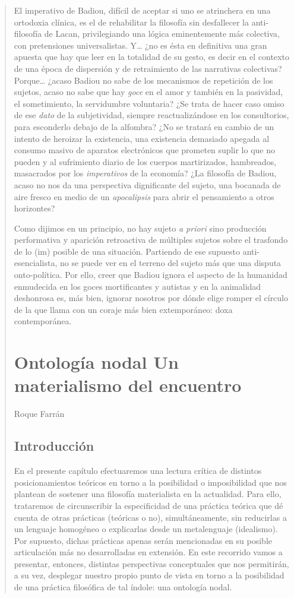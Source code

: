 \begin{quote}
El imperativo de Badiou, difícil de aceptar si uno se atrinchera en una ortodoxia clínica, es el de rehabilitar la filosofía sin desfallecer la anti-filosofía de Lacan, privilegiando una lógica eminentemente más colectiva, con pretensiones universalistas. Y\ldots{} ¿no es ésta en definitiva una gran apuesta que hay que leer en la totalidad de su gesto, es decir en el contexto de una época de dispersión y de retraimiento de las narrativas colectivas? Porque\ldots{} ¿acaso Badiou no sabe de los mecanismos de repetición de los sujetos, acaso no sabe que hay \emph{goce} en el amor y también en la pasividad, el sometimiento, la servidumbre voluntaria? ¿Se trata de hacer caso omiso de ese \emph{dato} de la subjetividad, siempre reactualizándose en los consultorios, para esconderlo debajo de la alfombra? ¿No se tratará en cambio de un intento de heroizar la existencia, una existencia demasiado apegada al consumo masivo de aparatos electrónicos que prometen suplir lo que no pueden y al sufrimiento diario de los cuerpos martirizados, hambreados, masacrados por los \emph{imperativos} de la economía? ¿La filosofía de Badiou, acaso no nos da una perspectiva dignificante del sujeto, una bocanada de aire fresco en medio de un \emph{apocalipsis} para abrir el pensamiento a otros horizontes?

Como dijimos en un principio, no hay sujeto \emph{a priori} sino producción performativa y aparición retroactiva de múltiples sujetos sobre el trasfondo de lo (im) posible de una situación. Partiendo de ese supuesto anti-esencialista, no se puede ver en el terreno del sujeto más que una disputa onto-política. Por ello, creer que Badiou ignora el aspecto de la humanidad enmudecida en los goces mortificantes y autistas y en la animalidad deshonrosa es, más bien, ignorar nosotros por dónde elige romper el círculo de la que llama con un coraje más bien extemporáneo: doxa contemporánea.

\chapter{Ontología nodal Un materialismo del encuentro}

Roque Farrán

\section{Introducción}

En el presente capítulo efectuaremos una lectura crítica de distintos posicionamientos teóricos en torno a la posibilidad o imposibilidad que nos plantean de sostener una filosofía materialista en la actualidad. Para ello, trataremos de circunscribir la especificidad de una práctica teórica que dé cuenta de otras prácticas (teóricas o no), simultáneamente, sin reducirlas a un lenguaje homogéneo o explicarlas desde un metalenguaje (idealismo). Por supuesto, dichas prácticas apenas serán mencionadas en su posible articulación más no desarrolladas en extensión. En este recorrido vamos a presentar, entonces, distintas perspectivas conceptuales que nos permitirán, a su vez, desplegar nuestro propio punto de vista en torno a la posibilidad de una práctica filosófica de tal índole: una ontología nodal.


\end{quote}
